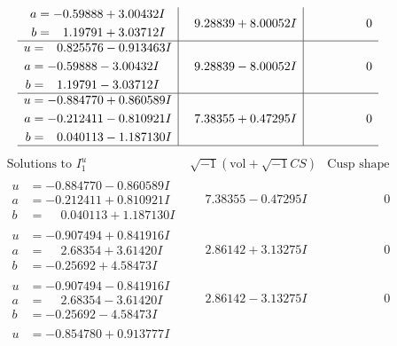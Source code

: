 \documentclass[1p]{elsarticle_modified}
\theoremstyle{definition}
\newcommand{\I}{\sqrt{-1}}
\begin{document}
$$\begin{array}{c|c|c}
\begin{aligned}
a &= -0.59888 + 3.00432 I \\
b &= \phantom{-}1.19791 + 3.03712 I\end{aligned}
 & \phantom{-}9.28839 + 8.00052 I & \phantom{-0.000000 } 0 \\ \hline\begin{aligned}
u &= \phantom{-}0.825576 - 0.913463 I \\
a &= -0.59888 - 3.00432 I \\
b &= \phantom{-}1.19791 - 3.03712 I\end{aligned}
 & \phantom{-}9.28839 - 8.00052 I & \phantom{-0.000000 } 0 \\ \hline\begin{aligned}
u &= -0.884770 + 0.860589 I \\
a &= -0.212411 - 0.810921 I \\
b &= \phantom{-}0.040113 - 1.187130 I\end{aligned}
 & \phantom{-}7.38355 + 0.47295 I & \phantom{-0.000000 } 0\\
 \hline 
 \end{array}$$\newpage$$\begin{array}{c|c|c}  
\text{Solutions to }I^u_{1}& \I (\text{vol} + \sqrt{-1}CS) & \text{Cusp shape}\\
 \hline 
\begin{aligned}
u &= -0.884770 - 0.860589 I \\
a &= -0.212411 + 0.810921 I \\
b &= \phantom{-}0.040113 + 1.187130 I\end{aligned}
 & \phantom{-}7.38355 - 0.47295 I & \phantom{-0.000000 } 0 \\ \hline\begin{aligned}
u &= -0.907494 + 0.841916 I \\
a &= \phantom{-}2.68354 + 3.61420 I \\
b &= -0.25692 + 4.58473 I\end{aligned}
 & \phantom{-}2.86142 + 3.13275 I & \phantom{-0.000000 } 0 \\ \hline\begin{aligned}
u &= -0.907494 - 0.841916 I \\
a &= \phantom{-}2.68354 - 3.61420 I \\
b &= -0.25692 - 4.58473 I\end{aligned}
 & \phantom{-}2.86142 - 3.13275 I & \phantom{-0.000000 } 0 \\ \hline\begin{aligned}
u &= -0.854780 + 0.913777 I \\

\end{aligned}
\end{array}$$
\end{document}
